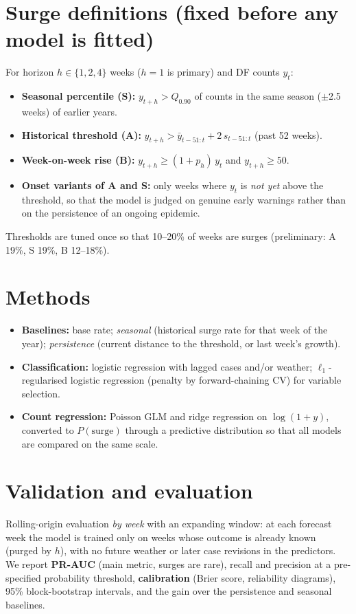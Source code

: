 \documentclass[10pt,a4paper]{article}
\begin{document}
\section{Surge definitions (fixed before any model is fitted)}
For horizon $h\in\{1,2,4\}$ weeks ($h=1$ is primary) and DF counts $y_t$:
\begin{itemize}
  \item \textbf{Seasonal percentile (S):} $y_{t+h} > Q_{0.90}$ of counts in the same season ($\pm$2.5 weeks) of earlier years.
  \item \textbf{Historical threshold (A):} $y_{t+h} > \bar y_{t-51:t} + 2\,s_{t-51:t}$ (past 52 weeks).
  \item \textbf{Week-on-week rise (B):} $y_{t+h} \ge (1+p_h)\,y_t$ and $y_{t+h}\ge 50$.
  \item \textbf{Onset variants of A and S:} only weeks where $y_t$ is \emph{not yet} above the threshold, so that
        the model is judged on genuine early warnings rather than on the persistence of an ongoing epidemic.
\end{itemize}
Thresholds are tuned once so that 10--20\% of weeks are surges (preliminary: A 19\%, S 19\%, B 12--18\%).

\section{Methods}
\begin{itemize}
  \item \textbf{Baselines:} base rate; \emph{seasonal} (historical surge rate for that week of the year);
        \emph{persistence} (current distance to the threshold, or last week's growth).
  \item \textbf{Classification:} logistic regression with lagged cases and/or weather; $\ell_1$-regularised
        logistic regression (penalty by forward-chaining CV) for variable selection.
  \item \textbf{Count regression:} Poisson GLM and ridge regression on $\log(1+y)$, converted to $P(\text{surge})$
        through a predictive distribution so that all models are compared on the same scale.
\end{itemize}

\section{Validation and evaluation}
Rolling-origin evaluation \emph{by week} with an expanding window: at each forecast week the model is trained only
on weeks whose outcome is already known (purged by $h$), with no future weather or later case revisions in the
predictors. We report \textbf{PR-AUC} (main metric, surges are rare), recall and precision at a pre-specified
probability threshold, \textbf{calibration} (Brier score,
reliability diagrams), 95\% block-bootstrap intervals, and the gain over the persistence and seasonal baselines.
\end{document}
